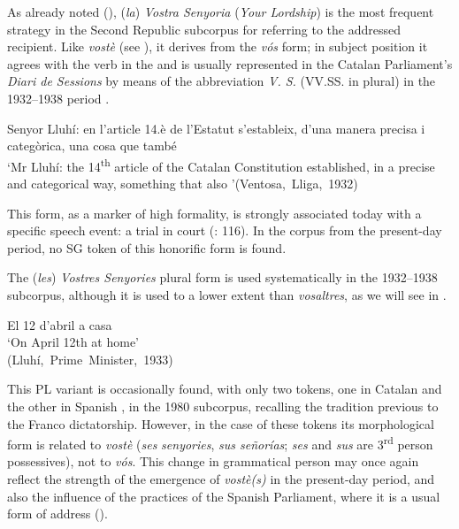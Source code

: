 \documentclass[output=paper]{langscibook}
\begin{document}
\label{sec:nogue:2.2.1.4}


As already noted (), (\textit{la}) \textit{Vostra Senyoria} (\textit{Your Lordship}) is the most frequent strategy in the Second Republic subcorpus for referring to the addressed recipient. Like \textit{vostè} (see ), it derives from the \textit{vós} form; in subject position it agrees with the verb in the  and is usually represented in the Catalan Parliament’s \textit{Diari de Sessions} by means of the abbreviation \textit{V. S.} (VV.SS. in plural) in the 1932–1938 period .


\ea\label{ex:nogue:23}
{{Senyor Lluhí: en l’article 14.è de l’Estatut s’estableix, d’una manera precisa i categòrica, una cosa que també} }\\
\glt `Mr Lluhí: the 14\textsuperscript{th} article of the Catalan Constitution established, in a precise and categorical way, something that    also '\hfill\hbox{(Ventosa, Lliga, 1932)}\\
\z 


This form, as a marker of high formality, is strongly associated today with a specific speech event: a trial in court (\citealt{DeCockNogué2017}: 116). In the corpus from the present-day period, no SG token of this honorific form is found.



The (\textit{les}) \textit{Vostres Senyories} plural form is used systematically in the 1932–1938 subcorpus, although it is used to a lower extent than \textit{vosaltres}, as we will see in  .

\ea\label{ex:nogue:24}
{{{El 12 d’abril}  {a casa} }}\\
\glt `On April 12th    at home'\\
\hfill\hbox{(Lluhí, Prime Minister, 1933)}
\z 


This PL variant is occasionally found, with only two tokens, one in Catalan  and the other in Spanish , in the 1980 subcorpus, recalling the tradition previous to the Franco dictatorship. However, in the case of these tokens its morphological form is related to \textit{vostè} (\textit{ses} \textit{senyories}, \textit{sus señorías}; \textit{ses} and \textit{sus} are 3\textsuperscript{rd} person possessives), not to \textit{vós}. This change in grammatical person may once again reflect the strength of the emergence of \textit{vostè(s)} in the present-day period, and also the influence of the practices of the Spanish Parliament, where it is a usual form of address (\citealt{DeCockNogué2017}).
\end{document}
